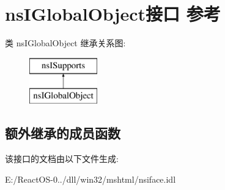 \hypertarget{interfacens_i_global_object}{}\section{ns\+I\+Global\+Object接口 参考}
\label{interfacens_i_global_object}
类 ns\+I\+Global\+Object 继承关系图\+:\begin{figure}[H]
\begin{center}
\leavevmode
\includegraphics[height=2.000000cm]{interfacens_i_global_object}
\end{center}
\end{figure}
\subsection*{额外继承的成员函数}


该接口的文档由以下文件生成\+:\begin{DoxyCompactItemize}
\item 
E\+:/\+React\+O\+S-\/0../dll/win32/mshtml/nsiface.\+idl\end{DoxyCompactItemize}
